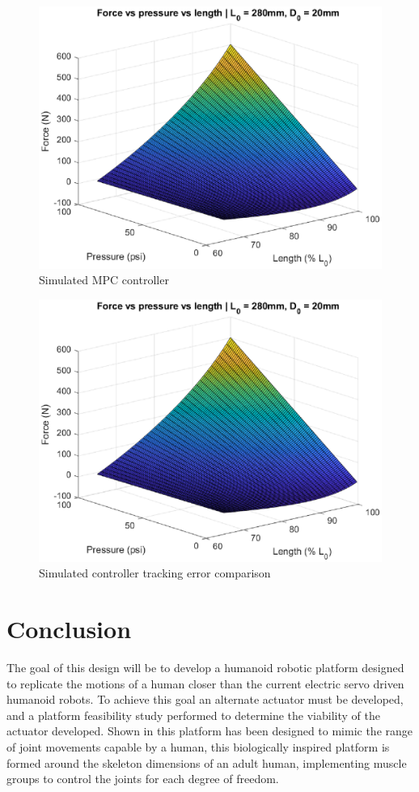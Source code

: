 \documentclass[11pt,a4paper]{article}
\begin{document}
\begin{figure}[!hbt]
    \centering
    \includegraphics[scale=0.8]{staticmap.eps}
    \caption{Simulated MPC controller}
    \label{fig:simulated_mpc}
\end{figure}
\begin{figure}[!hbt]
    \centering
    \includegraphics[scale=0.8]{staticmap.eps}
    \caption{Simulated controller tracking error comparison}
    \label{fig:controller_tracking_error}
\end{figure}

\clearpage
\section{Conclusion}
\label{sec:conclusion}
The goal of this design  will be to develop a humanoid robotic platform designed to replicate the motions of a human closer than the current electric servo driven humanoid robots. To achieve this goal an alternate actuator must be developed, and a platform feasibility study performed to determine the viability of the actuator developed. Shown in  this platform has been designed to mimic the range of joint movements capable by a human, this biologically inspired platform is formed around the skeleton dimensions of an adult human, implementing muscle groups to control the joints for each degree of freedom. \newline
\end{document}
